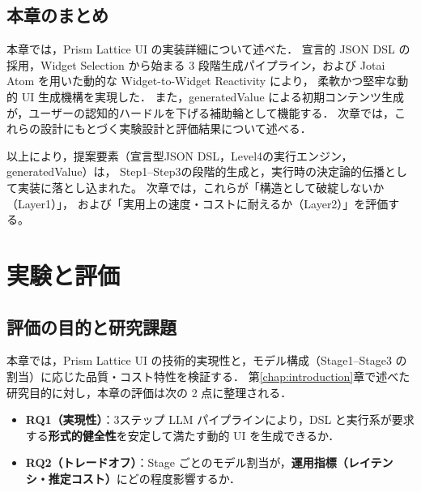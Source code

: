 \documentclass[senior,final,11pt,dvipdfmx]{iputit-thesis}
\begin{document}
\section{本章のまとめ}
本章では，Prism Lattice UI の実装詳細について述べた．
宣言的 JSON DSL の採用，Widget Selection から始まる 3 段階生成パイプライン，および Jotai Atom を用いた動的な Widget-to-Widget Reactivity により，
柔軟かつ堅牢な動的 UI 生成機構を実現した．
また，generatedValue による初期コンテンツ生成が，ユーザーの認知的ハードルを下げる補助輪として機能する．
次章では，これらの設計にもとづく実験設計と評価結果について述べる．

以上により，提案要素（宣言型JSON DSL，Level4の実行エンジン，generatedValue）は，
Step1--Step3の段階的生成と，実行時の決定論的伝播として実装に落とし込まれた。
次章では，これらが「構造として破綻しないか（Layer1）」，
および「実用上の速度・コストに耐えるか（Layer2）」を評価する。




\chapter{実験と評価}
\label{chap:evaluation}

\section{評価の目的と研究課題}
本章では，Prism Lattice UI の技術的実現性と，モデル構成（Stage1--Stage3 の割当）に応じた品質・コスト特性を検証する．
第\ref{chap:introduction}章で述べた研究目的に対し，本章の評価は次の 2 点に整理される．

\begin{itemize}
  \item \textbf{RQ1（実現性）}：3ステップ LLM パイプラインにより，DSL と実行系が要求する\textbf{形式的健全性}を安定して満たす動的 UI を生成できるか．
  \item \textbf{RQ2（トレードオフ）}：Stage ごとのモデル割当が，\textbf{運用指標（レイテンシ・推定コスト）}にどの程度影響するか．
\end{itemize}
\end{document}
